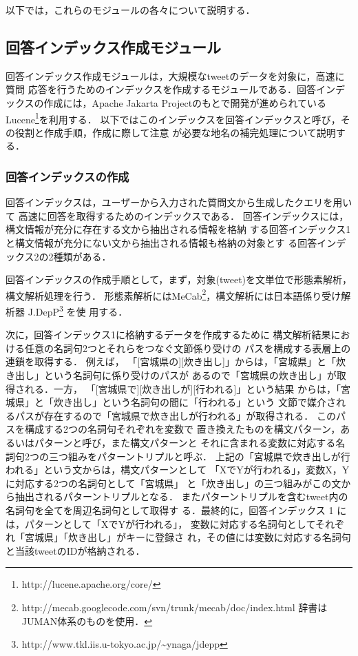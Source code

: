 \documentclass[japanese]{jnlp_1.4}
\begin{document}
以下では，これらのモジュールの各々について説明する．


\subsection{回答インデックス作成モジュール}
\label{making_index}

回答インデックス作成モジュールは，大規模なtweetのデータを対象に，高速に質問
応答を行うためのインデックスを作成するモジュールである．回答インデックスの作成には，Apache Jakarta Projectのもとで開発が進められているLucene\footnote{http://lucene.apache.org/core/}を利用する．
以下ではこのインデックスを回答インデックスと呼び，その役割と作成手順，作成に際して注意
が必要な地名の補完処理について説明する．


\subsubsection{回答インデックスの作成}

回答インデックスは，ユーザーから入力された質問文から生成したクエリを用いて
高速に回答を取得するためのインデックスである．
回答インデックスには，構文情報が充分に存在する文から抽出される情報を格納
する回答インデックス1と構文情報が充分にない文から抽出される情報も格納の対象とす
る回答インデックス2の2種類がある．

回答インデックスの作成手順として，まず，対象(tweet)を文単位で形態素解析，構文解析処理を行う．
形態素解析にはMeCab\footnote{http://mecab.googlecode.com/svn/trunk/mecab/doc/index.html 
辞書はJUMAN体系のものを使用．}，構文解析には日本語係り受け解析器
J.DepP\footnote{http://www.tkl.iis.u-tokyo.ac.jp/{\textasciitilde}ynaga/jdepp} を使
用する．

次に，回答インデックス1に格納するデータを作成するために
構文解析結果における任意の名詞句2つとそれらをつなぐ文節係り受けの
パスを構成する表層上の連鎖を取得する．
例えば，
「[宮城県の][炊き出し]」からは，「宮城県」と「炊き出し」という名詞句に係り受けのパスが
あるので「宮城県の炊き出し」が取得される．一方，
「[宮城県で][炊き出しが][行われる]」という結果
からは，「宮城県」と「炊き出し」という名詞句の間に「行われる」という
文節で媒介されるパスが存在するので「宮城県で炊き出しが行われる」が取得される．
このパスを構成する2つの名詞句それぞれを変数で
置き換えたものを構文パターン，あるいはパターンと呼び，また構文パターンと
それに含まれる変数に対応する名詞句2つの三つ組みをパターントリプルと呼ぶ．
上記の「宮城県で炊き出しが行われる」という文からは，構文パターンとして
「XでYが行われる」，変数X，Yに対応する2つの名詞句として「宮城県」
と「炊き出し」の三つ組みがこの文から抽出されるパターントリプルとなる．
またパターントリプルを含むtweet内の名詞句を全てを周辺名詞句として取得す
る．最終的に，回答インデックス 1 には，パターンとして「XでYが行われる」，
変数に対応する名詞句としてそれぞれ「宮城県」「炊き出し」がキーに登録さ
れ，その値には変数に対応する名詞句と当該tweetのIDが格納される．
\end{document}
